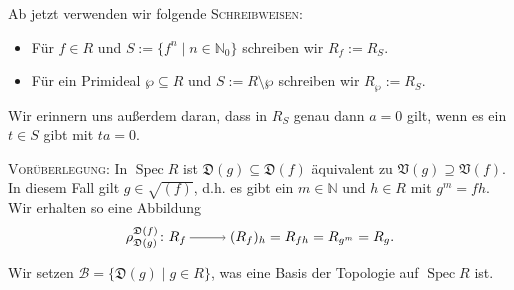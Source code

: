 \documentclass[a4paper,12pt,index=toc]{scrbook}
\theoremstyle{keinenummern} %
\def\V{\mathfrak{V}}
\newcommand{\D}{\mathfrak{D}}
\def\B{\mathcal{B}}
\newcommand{\Spec}{\operatorname{Spec}}
\newcommand{\set}[1]{\ensuremath{\mathbb{#1}}}
\newcommand{\N}{\set{N}}
\begin{document}
Ab jetzt verwenden wir folgende \textsc{Schreibweisen}:
\begin{itemize}
\item Für $f\in R$ und $S:=\{f^n\mid n\in\N_0\}$ schreiben wir $R_f:=R_S$.
\item Für ein Primideal $\wp\subseteq R$ und $S:=R\setminus\wp$ schreiben wir $R_\wp:=R_S$.
\end{itemize}

Wir erinnern uns außerdem daran, dass in $R_S$ genau dann  $a=0$ gilt, wenn es ein $t\in S$ gibt mit $ta=0$.

\textsc{Vorüberlegung}: In $\Spec R$ ist $\D(g)\subseteq \D(f)$ äquivalent zu $\V(g)\supseteq\V(f)$. In diesem Fall gilt
$g\in\sqrt{(f)}$, d.h. es gibt ein $m\in\N$ und $h\in R$ mit $g^m=fh$. Wir erhalten so eine Abbildung
\begin{equation*} \rho_{\D(g)}^{\D(f)}\colon R_f\ra (R_f)_h=R_{fh}=R_{g^m}=R_g. \end{equation*}

Wir setzen $\B=\{\D(g)\mid g\in R\}$, was eine Basis der Topologie auf $\Spec R$ ist.
\end{document}

